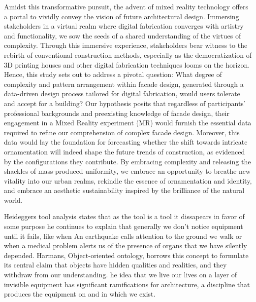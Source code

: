 Amidst this transformative pursuit, the advent of mixed reality technology offers a portal to vividly convey the vision of future architectural design.
Immersing stakeholders in a virtual realm where digital fabrication converges with artistry and functionality, we sow the seeds of a shared understanding of the virtues of complexity.
Through this immersive experience, stakeholders bear witness to the rebirth of conventional construction methods, especially as the democratization of 3D printing houses and other digital fabrication techniques looms on the horizon.
Hence, this study sets out to address a pivotal question: What degree of complexity and pattern arrangement within facade design, generated through a data-driven design process tailored for digital fabrication, would users tolerate and accept for a building?
Our hypothesis posits that regardless of participants' professional backgrounds and preexisting knowledge of facade design, their engagement in a Mixed Reality experiment (MR) would furnish the essential data required to refine our comprehension of complex facade design.
Moreover, this data would lay the foundation for forecasting whether the shift towards intricate ornamentation will indeed shape the future trends of construction, as evidenced by the configurations they contribute.
By embracing complexity and releasing the shackles of mass-produced uniformity, we embrace an opportunity to breathe new vitality into our urban realms, rekindle the essence of ornamentation and identity, and embrace an aesthetic sustainability inspired by the brilliance of the natural world.



        

Heideggers tool analysis states that as the tool is a tool it dissapears in favor of some purpose he continues to explain that generally we don't notice equipment until it fails, like when An earthquake calls attention to the ground we walk or when a medical problem alerts us of the presence of organs that we have silently depended\cite{Harman2011}.
Harmans, Object-oriented ontology, borrows this concept to formulate its central claim that objects have hidden qualities and realities, and they withdraw from our understanding.\cite{Gage2015}
he idea that we live our lives on a layer of invisible equipment has significant ramifications for architecture, a discipline that produces the equipment on and in which we exist.\cite{Gage2015}

